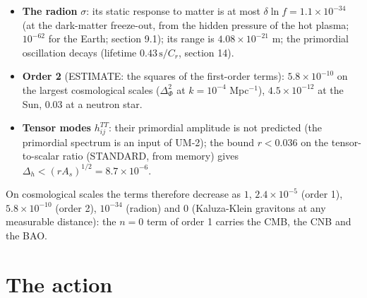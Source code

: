 \documentclass[
  10pt,
]{article}
\begin{document}
\begin{itemize}
  Two static masses \(M\) and \(m\) with the normalised \(x_0\) profiles
  \(\varrho_M\) and \(\varrho_m\) attract at the distance \(r\) with
  \[ V(r) = -\frac{G_NMm}{r}\Big[1 + \sum_{n\ge1}\alpha_ne^{-m_nr}\Big],\qquad \alpha_n = \frac{N_0}{N_n}\Big(\int\varrho_M\,u_n\,d\xi\Big)\Big(\int\varrho_m\,u_n\,d\xi\Big),\qquad m_n = \frac{\sqrt{\Lambda_n}}{fL}; \]
  for two masses with the same profile \(\varrho\) the strength is
  \((N_0/N_n)(\int\varrho\,u_n\,d\xi)^2\): \(\alpha_n = 0.0728\),
  \(0.1469\), \(0.1809\) for two sources at the fold, \(0.0904\),
  \(0.0136\), \(0.0057\) for the quark-doublet zero-mode profile and
  \(0.0208\), \(0.0197\), \(0.0105\) for the lepton doublet; a source
  with the flat profile of the gauge zero modes (the gluon field energy,
  which makes up most of the nucleon mass) excites none
  (\(\int e^{3\eta\xi}u_n\,d\xi = 0\), orthogonality to \(u_0\)).
  \(m_1 = m_{KK} = 121.32\) TeV, whose range
  \(\hbar c/m_1 = 1.63\times10^{-21}\) m makes
  \(e^{-m_1r} = e^{-3.1\times10^{16}}\) at \(50\) micrometres: Newton's
  law is exact at every measurable distance.
\item
  \textbf{The radion} \(\sigma\): its static response to matter is at
  most \(\delta\ln f = 1.1\times10^{-34}\) (at the dark-matter
  freeze-out, from the hidden pressure of the hot plasma; \(10^{-62}\)
  for the Earth; section 9.1); its range is \(4.08\times10^{-21}\) m;
  the primordial oscillation decays (lifetime \(0.43\,\text{s}/C_r\),
  section 14).
\item
  \textbf{Order 2} (ESTIMATE: the squares of the first-order terms):
  \(5.8\times10^{-10}\) on the largest cosmological scales
  (\(\Delta_\Phi^2\) at \(k = 10^{-4}\) Mpc\(^{-1}\)),
  \(4.5\times10^{-12}\) at the Sun, \(0.03\) at a neutron star.
\item
  \textbf{Tensor modes} \(h^{TT}_{ij}\): their primordial amplitude is
  not predicted (the primordial spectrum is an input of UM-2); the bound
  \(r < 0.036\) on the tensor-to-scalar ratio (STANDARD, from memory)
  gives \(\Delta_h < (rA_s)^{1/2} = 8.7\times10^{-6}\).
\end{itemize}

On cosmological scales the terms therefore decrease as \(1\),
\(2.4\times10^{-5}\) (order 1), \(5.8\times10^{-10}\) (order 2),
\(10^{-34}\) (radion) and \(0\) (Kaluza-Klein gravitons at any
measurable distance): the \(n = 0\) term of order 1 carries the CMB, the
CNB and the BAO.

\hypertarget{the-action}{%
\section{The action}\label{the-action}}
\end{document}
